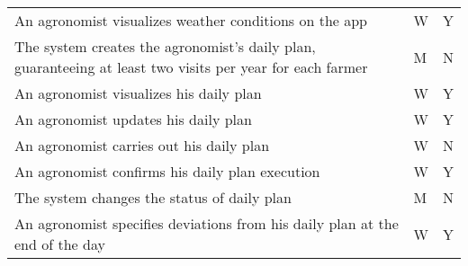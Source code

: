 \begin{center}
\begin{longtable}{ |m{7cm}|C{2.3cm}|C{1.6cm}|}
An agronomist visualizes weather conditions on the app & W & Y\\
The system creates the agronomist's daily plan, guaranteeing at least two visits per year for each farmer & M & N\\
An agronomist visualizes his daily plan & W & Y\\
An agronomist updates his daily plan & W & Y\\
An agronomist carries out his daily plan & W & N\\
An agronomist confirms his daily plan execution & W & Y\\
The system changes the status of daily plan & M & N\\
An agronomist specifies deviations from his daily plan at the end of the day & W & Y\\

\end{longtable}

\end{center}